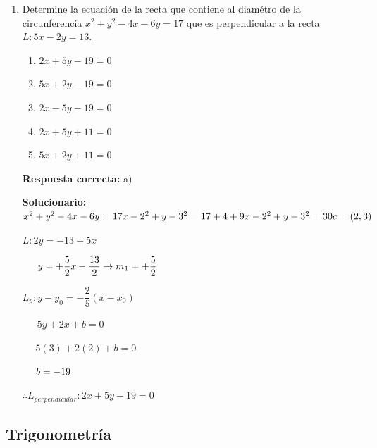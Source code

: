 \begin{enumerate}[resume]
	
	\item Determine la ecuación de la recta que contiene al diamétro de la circunferencia $x^2+y^2-4x-6y=17$ que es perpendicular a la recta $L:5x-2y=13$.
	\begin{enumerate}[label=\alph*)]
		\item $2x+5y-19=0$
		\item $5x+2y-19=0$
		\item $2x-5y-19=0$
		\item $2x+5y+11=0$
		\item $5x+2y+11=0$
	\end{enumerate}
	
	\textbf{Respuesta correcta:} a)
	
	\vspace{2mm}
	\textbf{Solucionario:}\\
	
	$x^2+y^2-4x-6y=17\\
	{x-2}^2+{y-3}^2=17+4+9\\
	{x-2}^2+{y-3}^2=30\\
	c=(2,3)\\$
	
	$L:2y =  - 13 + 5x$
	
	$\,\,\,\,\,\,\,\,\,y =  + \dfrac{5}{2}x - \dfrac{{13}}{2} \to {m_1} =  + \dfrac{5}{2}\\$
	
	
	${L_p}:y - {y_0} =  - \dfrac{2}{5}(x - {x_0})$
	
	$\,\,\,\,\,\,\,\,\,5y + 2x + b = 0$
	
	$\,\,\,\,\,\,\,\,5(3) + 2(2) + b = 0$
	
	$\,\,\,\,\,\,\,\,b =  - 19\\$
	
	$\therefore {L_{perpendicular}} : 2x + 5y - 19 = 0$
	
	
	
	
\end{enumerate}


\subsection*{Trigonometría}

